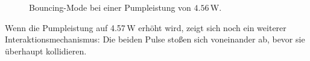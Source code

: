 \documentclass[bachelor,       %
               twoside,        %
               BCOR10mm,       %
               english,ngerman, %
               ]{GAUBM}
\begin{document}
\begin{figure}[!htb]
   \centering   
   \hfill
   \caption{Bouncing-Mode bei einer Pumpleistung von $4.56\,$W.}
   \label{fig:bouncing456}
 \end{figure}

Wenn die Pumpleistung auf 4.57\,W erhöht wird, zeigt sich noch ein weiterer Interaktionsmechanismus: Die beiden Pulse stoßen sich voneinander ab, bevor sie überhaupt kollidieren.
\end{document}
